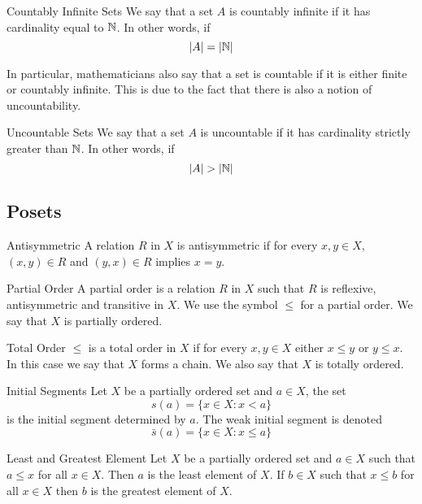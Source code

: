 \documentclass[a4paper]{article}
\begin{document}
\begin{defn}{Countably Infinite Sets}{} We say that a set $A$ is countably infinite if it has cardinality equal to $\mathbb{N}$. In other words, if $$\abs{A}=\abs{\mathbb{N}}$$
\end{defn}

In particular, mathematicians also say that a set is countable if it is either finite or countably infinite. This is due to the fact that there is also a notion of uncountability. 

\begin{defn}{Uncountable Sets}{} We say that a set $A$ is uncountable if it has cardinality strictly greater than $\mathbb{N}$. In other words, if $$\abs{A}>\abs{\mathbb{N}}$$
\end{defn}

\subsection{Posets}
\begin{defn}{Antisymmetric}{} A relation $R$ in $X$ is antisymmetric if for every $x,y\in X$, $(x,y)\in R$ and $(y,x)\in R$ implies $x=y$. 
\end{defn}

\begin{defn}{Partial Order}{} A partial order is a relation $R$ in $X$ such that $R$ is reflexive, antisymmetric and transitive in $X$. We use the symbol $\leq$ for a partial order. We say that $X$ is partially ordered. 
\end{defn}

\begin{defn}{Total Order}{} $\leq$ is a total order in $X$ if for every $x,y\in X$ either $x\leq y$ or $y\leq x$. In this case we say that $X$ forms a chain. We also say that $X$ is totally ordered. 
\end{defn}

\begin{defn}{Initial Segments}{} Let $X$ be a partially ordered set and $a\in X$, the set $$s(a)=\{x\in X:x<a\}$$ is the initial segment determined by $a$. The weak initial segment is denoted $$\bar{s}(a)=\{x\in X:x\leq a\}$$ 
\end{defn}

\begin{defn}{Least and Greatest Element}{} Let $X$ be a partially ordered set and $a\in X$ such that $a\leq x$ for all $x\in X$. Then $a$ is the least element of $X$. If $b\in X$ such that $x\leq b$ for all $x\in X$ then $b$ is the greatest element of $X$. 
\end{defn}
\end{document}
